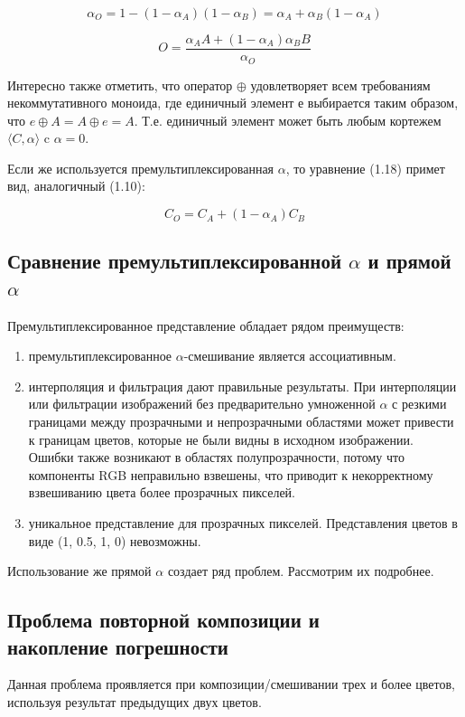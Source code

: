 \begin{equation}
\alpha_{O} = 1 - (1 - \alpha_{A})(1 - \alpha_{B}) =  \alpha_{A} + \alpha_{B}(1-\alpha_{A})
\end{equation}

\begin{equation}
O = \frac{\alpha_{A}A + (1-\alpha_{A})\alpha_{B}B}{\alpha_{O}}
\end{equation}

Интересно также отметить, что оператор  $\oplus$ удовлетворяет всем требованиям некоммутативного моноида, где единичный элемент $е$ выбирается таким образом, что  $e\oplus A = A \oplus e = A$. Т.е. единичный элемент может быть любым кортежем $\langle C, \alpha \rangle$ c $\alpha = 0$.

Если же используется премультиплексированная $\alpha$, то уравнение (1.18) примет вид, аналогичный (1.10): 

\begin{equation}
C_{O} = C_{A} + (1-\alpha_{A})C_{B}
\end{equation}

\subsection{Сравнение премультиплексированной  $\alpha$ и прямой $\alpha$}
Премультиплексированное представление обладает рядом преимуществ: 
\begin{enumerate}
	\item премультиплексированное $\alpha$-смешивание является ассоциативным.
	\item интерполяция и фильтрация дают правильные результаты. При интерполяции или фильтрации изображений без предварительно умноженной $\alpha$ с резкими границами между прозрачными и непрозрачными областями  может привести к границам цветов, которые не были видны в исходном изображении. Ошибки также возникают в областях полупрозрачности, потому что компоненты RGB неправильно взвешены, что приводит к некорректному взвешиванию цвета более прозрачных пикселей.
	\item уникальное представление для прозрачных пикселей. Представления цветов в виде (1, 0.5, 1, 0) невозможны.
\end{enumerate}
Использование же прямой $\alpha$ создает ряд проблем. Рассмотрим их подробнее.
 
\subsection{Проблема повторной композиции и \\ накопление погрешности}
Данная проблема проявляется при композиции/смешивании трех и более цветов, используя результат предыдущих двух цветов.

